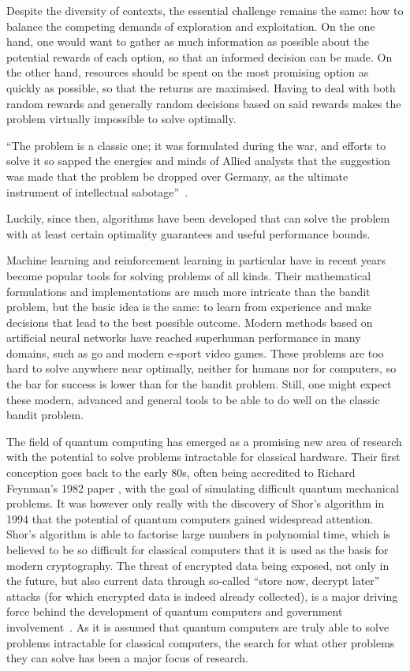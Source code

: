 Despite the diversity of contexts, the essential challenge remains the same: how to balance the competing demands of exploration and exploitation.
On the one hand, one would want to gather as much information as possible about the potential rewards of each option, so that an informed decision can be made.
On the other hand, resources should be spent on the most promising option as quickly as possible, so that the returns are maximised.
Having to deal with both random rewards and generally random decisions based on said rewards makes the problem virtually impossible to solve optimally.
\begin{displayquote}
    \enquote{The problem is a  classic one; it was formulated during the war, and efforts to solve it so sapped the energies and minds of Allied analysts that the suggestion was made that the problem be dropped over Germany, as the ultimate instrument of intellectual sabotage}~\autocite{whittle1979}.
\end{displayquote}
Luckily, since then, algorithms have been developed that can solve the problem with at least certain optimality guarantees and useful performance bounds.

Machine learning and reinforcement learning in particular have in recent years become popular tools for solving problems of all kinds.
Their mathematical formulations and implementations are much more intricate than the bandit problem, but the basic idea is the same: to learn from experience and make decisions that lead to the best possible outcome.
Modern methods based on artificial neural networks have reached superhuman performance in many domains, such as go and modern e-sport video games.
These problems are too hard to solve anywhere near optimally, neither for humans nor for computers, so the bar for success is lower than for the bandit problem.
Still, one might expect these modern, advanced and general tools to be able to do well on the classic bandit problem.

The field of quantum computing has emerged as a promising new area of research with the potential to solve problems intractable for classical hardware.
Their first conception goes back to the early 80s, often being accredited to Richard Feynman's 1982 paper \cite{feynman1982}, with the goal of simulating difficult quantum mechanical problems.
It was however only really with the discovery of Shor's algorithm in 1994 \cite{shor1994} that the potential of quantum computers gained widespread attention.
Shor's algorithm is able to factorise large numbers in polynomial time, which is believed to be so difficult for classical computers that it is used as the basis for modern cryptography.
The threat of encrypted data being exposed, not only in the future, but also current data through so-called \enquote{store now, decrypt later} attacks (for which encrypted data is indeed already collected), is a major driving force behind the development of quantum computers and government involvement~\autocite{alagic2022, cisa2022}.
As it is assumed that quantum computers are truly able to solve problems intractable for classical computers, the search for what other problems they can solve has been a major focus of research.

